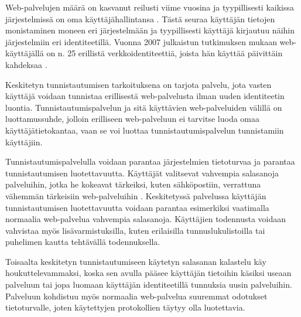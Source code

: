 Web-palvelujen määrä on kasvanut reilusti viime vuosina ja tyypillisesti kaikissa järjestelmissä on oma käyttäjähallintansa \cite{billion_keys}. Tästä seuraa käyttäjän tietojen monistaminen moneen eri järjestelmään ja tyypillisesti käyttäjä kirjautuu näihin järjestelmiin eri identiteetillä. Vuonna 2007 julkaistun tutkimuksen mukaan web-käyttäjällä on n. 25 erillistä verkkoidentiteettiä, joista hän käyttää päivittäin kahdeksaa \cite{password_habits}.

Keskitetyn tunnistautumisen tarkoituksena on tarjota palvelu, jota vasten käyttäjä voidaan tunnistaa erillisestä web-palvelusta ilman uuden identiteetin luontia. Tunnistautumispalvelun ja sitä käyttävien web-palveluiden välillä on luottamussuhde, jolloin erilliseen web-palveluun ei tarvitse luoda omaa käyttäjätietokantaa, vaan se voi luottaa tunnistautumispalvelun tunnistamiin käyttäjiin.

Tunnistautumispalvelulla voidaan parantaa järjestelmien tietoturvaa ja parantaa tunnistautumisen luotettavuutta. Käyttäjät valitsevat vahvempia salasanoja palveluihin, jotka he kokeavat tärkeiksi, kuten sähköpostiin, verrattuna vähemmän tärkeisiin web-palveluihin \cite{password_habits}. Keskitetyssä palvelussa käyttäjän tunnistautumisen luotettavuutta voidaan parantaa esimerkiksi vaatimalla normaalia web-palvelua vahvempia salasanoja. Käyttäjien todennusta voidaan vahvistaa myös lisävarmistuksilla, kuten erilaisilla tunnuslukulistoilla tai puhelimen kautta tehtävällä todennuksella.

Toisaalta keskitetyn tunnistautumiseen käytetyn salasanan kalastelu käy houkuttelevammaksi, koska sen avulla pääsee käyttäjän tietoihin käsiksi useaan palveluun tai jopa luomaan käyttäjän identiteetillä tunnuksia uusin palveluihin. Palveluun kohdistuu myös normaalia web-palvelua suuremmat odotukset tietoturvalle, joten käytettyjen protokollien täytyy olla luotettavia.
